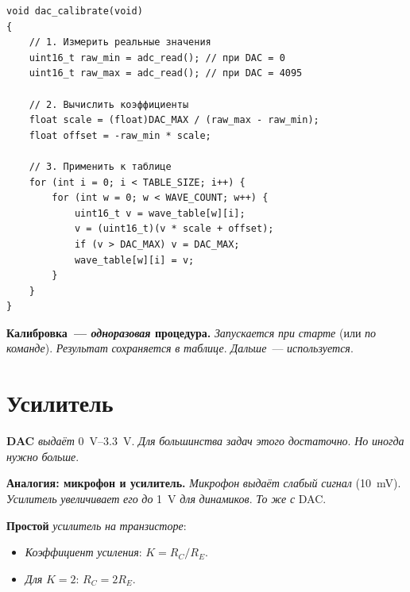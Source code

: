 \begin{listing}[htbp]
\begin{verbatim}
void dac_calibrate(void)
{
    // 1. Измерить реальные значения
    uint16_t raw_min = adc_read(); // при DAC = 0
    uint16_t raw_max = adc_read(); // при DAC = 4095

    // 2. Вычислить коэффициенты
    float scale = (float)DAC_MAX / (raw_max - raw_min);
    float offset = -raw_min * scale;

    // 3. Применить к таблице
    for (int i = 0; i < TABLE_SIZE; i++) {
        for (int w = 0; w < WAVE_COUNT; w++) {
            uint16_t v = wave_table[w][i];
            v = (uint16_t)(v * scale + offset);
            if (v > DAC_MAX) v = DAC_MAX;
            wave_table[w][i] = v;
        }
    }
}
\end{verbatim}
\caption{\texttt{dac\_calibrate()}~--- калибровка}
\label{lst:dac-calibrate}
\end{listing}

\begin{warnbox}
\textbf{Калибровка~--- \emph{одноразовая} процедура.}
\emph{Запускается} \emph{при} \emph{старте} (или
\emph{по} \emph{команде}). \emph{Результат}
\emph{сохраняется} \emph{в} \emph{таблице}.
\emph{Дальше}~--- \emph{используется}.
\end{warnbox}

\section{Усилитель}
\label{sec:dac-amplifier}

\textbf{DAC} \emph{выдаёт} \SI{0}{\volt}--\SI{3.3}{\volt}.
\emph{Для} \emph{большинства} \emph{задач} \emph{этого}
\emph{достаточно}. \emph{Но} \emph{иногда} \emph{нужно}
\emph{больше}.

\begin{ideabox}
\textbf{Аналогия: микрофон и усилитель.} \emph{Микрофон}
\emph{выдаёт} \emph{слабый} \emph{сигнал} (\SI{10}{\milli\volt}).
\emph{Усилитель} \emph{увеличивает} \emph{его} \emph{до}
\SI{1}{\volt} \emph{для} \emph{динамиков}. \emph{То} \emph{же}
\emph{с} DAC.
\end{ideabox}

\textbf{Простой} \emph{усилитель} \emph{на} \emph{транзисторе}:
\begin{itemize}
    \item \emph{Коэффициент} \emph{усиления}: $K = R_C / R_E$.
    \item \emph{Для} $K = 2$: $R_C = 2 R_E$.
\end{itemize}

